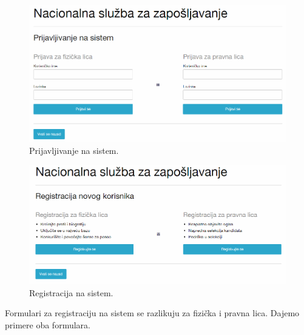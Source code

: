 \begin{figure}[H]
	\centering
	\includegraphics[width=\textwidth]{korisnicki-interfejs/slike/prijava.png}
	\caption{Prijavljivanje na sistem.}
	\label{for: prijava}
\end{figure}

\begin{figure}[H]
	\centering
	\includegraphics[width=\textwidth]{korisnicki-interfejs/slike/registracija.png}
	\caption{Registracija na sistem.}
	\label{for: registracija}
\end{figure}

Formulari za registraciju na sistem se razlikuju za fizi\v cka i pravna lica. Dajemo primere oba formulara.

